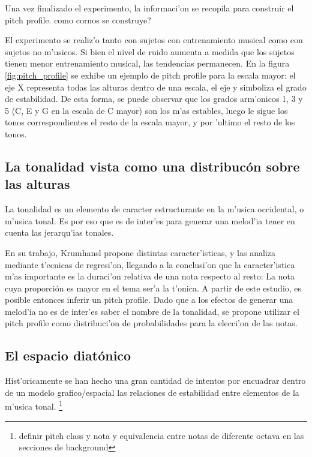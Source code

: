 Una vez finalizado el experimento, la informaci'on se recopila para construir el pitch profile. \alert{como cornos se construye?}

El experimento se realiz'o tanto con sujetos con entrenamiento musical como con sujetos no m'usicos. Si bien el nivel de ruido aumenta a medida que los sujetos 
tienen menor entrenamiento musical, las tendencias permanecen. En la figura \ref{fig:pitch_profile} se exhibe un ejemplo de pitch profile para la escala mayor: 
el eje X representa todas las alturas dentro de una escala, el eje y simboliza el grado de estabilidad. De esta forma, se puede observar que los grados arm'onicos
1, 3 y 5 (C, E y G en la escala de C mayor) son los m'as estables, luego le sigue los tonos correspondientes el resto de la escala mayor, y por 'ultimo el resto de los 
tonos.


\begin{imagen}
    \width{10cm}
\end{imagen}

\subsection{La tonalidad vista como una distribuc\'on sobre las alturas}
La tonalidad es un elemento de caracter estructurante en la m'usica occidental, o m'usica tonal. Es por eso que es de inter'es para generar una melod'ia tener en cuenta
las jerarqu'ias tonales. 

En su trabajo, Krumhansl propone distintas caracter'isticas, y las analiza mediante t'ecnicas de regresi'on, llegando a la conclusi'on que la
caracter'istica m'as importante es la duraci'on relativa de una nota respecto al resto: La nota cuya proporci\'on es mayor en el tema ser'a la t'onica. A partir de este 
estudio, es posible entonces inferir un pitch profile. Dado que a los efectos de generar una melod'ia no es de inter'es saber el nombre de la tonalidad, se propone 
utilizar el pitch profile como distribuci'on de probabilidades para la elecci'on de las notas.

\subsection{El espacio diat\'onico}
Hist'oricamente se han hecho una gran cantidad de intentos por encuadrar dentro de un modelo grafico/espacial las relaciones de estabilidad entre elementos de la m'usica
tonal. 
\footnote{definir pitch class y nota y equivalencia entre notas de diferente octava en las secciones de background} 

